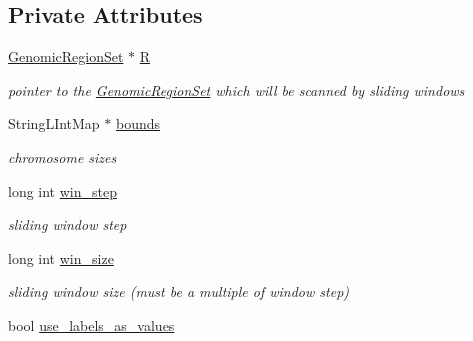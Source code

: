 \subsection*{Private Attributes}
\begin{DoxyCompactItemize}
\item 
\hypertarget{classGenomicRegionSetScanner_af76bf4fef482886f23f58cfa12c3eea1}{
\hyperlink{classGenomicRegionSet}{GenomicRegionSet} $\ast$ \hyperlink{classGenomicRegionSetScanner_af76bf4fef482886f23f58cfa12c3eea1}{R}}
\label{classGenomicRegionSetScanner_af76bf4fef482886f23f58cfa12c3eea1}

\begin{DoxyCompactList}\small\item\em pointer to the \hyperlink{classGenomicRegionSet}{GenomicRegionSet} which will be scanned by sliding windows \end{DoxyCompactList}\item 
\hypertarget{classGenomicRegionSetScanner_a7f64551c26331cd4ead1ab01405f1b72}{
StringLIntMap $\ast$ \hyperlink{classGenomicRegionSetScanner_a7f64551c26331cd4ead1ab01405f1b72}{bounds}}
\label{classGenomicRegionSetScanner_a7f64551c26331cd4ead1ab01405f1b72}

\begin{DoxyCompactList}\small\item\em chromosome sizes \end{DoxyCompactList}\item 
\hypertarget{classGenomicRegionSetScanner_ab278dfa27c3589865b9243156c1c727f}{
long int \hyperlink{classGenomicRegionSetScanner_ab278dfa27c3589865b9243156c1c727f}{win\_\-step}}
\label{classGenomicRegionSetScanner_ab278dfa27c3589865b9243156c1c727f}

\begin{DoxyCompactList}\small\item\em sliding window step \end{DoxyCompactList}\item 
\hypertarget{classGenomicRegionSetScanner_aeed625b2a12aa2f7900997c4e20cd9b5}{
long int \hyperlink{classGenomicRegionSetScanner_aeed625b2a12aa2f7900997c4e20cd9b5}{win\_\-size}}
\label{classGenomicRegionSetScanner_aeed625b2a12aa2f7900997c4e20cd9b5}

\begin{DoxyCompactList}\small\item\em sliding window size (must be a multiple of window step) \end{DoxyCompactList}\item 
\hypertarget{classGenomicRegionSetScanner_ad47603d08614ab993fe9036662c421e7}{
bool \hyperlink{classGenomicRegionSetScanner_ad47603d08614ab993fe9036662c421e7}{use\_\-labels\_\-as\_\-values}}
\label{classGenomicRegionSetScanner_ad47603d08614ab993fe9036662c421e7}


\end{DoxyCompactItemize}
